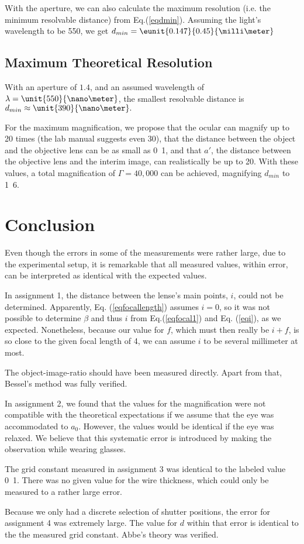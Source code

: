 \documentclass[a4paper,10pt]{article}
\begin{document}
With the aperture, we can also calculate the maximum resolution (i.e. the minimum resolvable distance) from Eq.(\ref{eqdmin}). Assuming the light's wavelength to be \unit{550}{\nano\meter}, we get $d_{min}=\eunit{0.147}{0.45}{\milli\meter}$

\subsection{Maximum Theoretical Resolution}
With an aperture of $1.4$, and an assumed wavelength of $\lambda = \unit{550}{\nano\meter}$, the smallest resolvable distance is $d_{min} \approx \unit{390}{\nano\meter}.$

For the maximum magnification, we propose that the ocular can magnify up to 20 times (the lab manual suggests even 30), that the distance between the object and the objective lens can be as small as \unit{0.1}{\milli\meter}, and that $a'$, the distance between the objective lens and the interim image, can realistically be up to \unit{20}{\centi\meter}. With these values, a total magnification of $\Gamma=40,000$ can be achieved, magnifying $d_{min}$ to \unit{1.6}{\centi\meter}.




\section{Conclusion}
Even though the errors in some of the measurements were rather large, due to the experimental setup, it is remarkable that all measured values, within error, can be interpreted as identical with the expected values.

In assignment 1, the distance between the lense's main points, $i$, could not be determined. Apparently, Eq. (\ref{eqfocallength}) assumes $i = 0$, so it was not possible to determine $\beta$ and thus $i$ from Eq.(\ref{eqfocal1}) and Eq. (\ref{eqi}), as we expected. Nonetheless, because our value for $f$, which must then really be $i+f$, is so close to the given focal length of \unit{4}{\centi\meter}, we can assume $i$ to be several millimeter at most.

The object-image-ratio should have been measured directly. Apart from that, Bessel's method was fully verified.

In assignment 2, we found that the values for the magnification were not compatible with the theoretical expectations if we assume that the eye was accommodated to $a_0$. However, the values would be identical if the eye was relaxed. We believe that this systematic error is introduced by making the observation while wearing glasses.

The grid constant measured in assignment 3 was identical to the labeled value \unit{0.1}{\milli\meter}. There was no given value for the wire thickness, which could only be measured to a rather large error.

Because we only had a discrete selection of shutter positions, the error for assignment 4 was extremely large. The value for $d$ within that error is identical to the the measured grid constant. Abbe's theory was verified.
\end{document}
